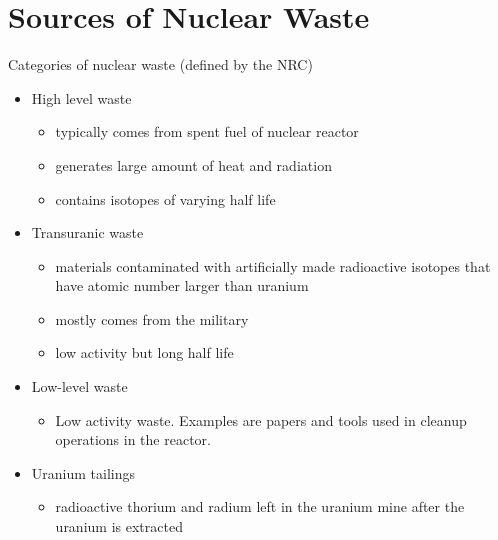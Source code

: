 \documentclass[10pt]{beamer}
\begin{document}
\section{Sources of Nuclear Waste}
\begin{frame}{Categories of nuclear waste (defined by the NRC) \cite{s01}}
\begin{itemize}[<+->]
\item \alert<13>{High level waste}
	\begin{itemize}
    \item typically comes from spent fuel of nuclear reactor
	\item generates large amount of heat and radiation
    \item contains isotopes of varying half life
    \end{itemize}
\item Transuranic waste
	\begin{itemize}
    \item materials contaminated with artificially made radioactive isotopes that have atomic number larger
    than uranium
    \item mostly comes from the military
    \item low activity but long half life
    \end{itemize}
\item Low-level waste
	\begin{itemize}
    \item Low activity waste. Examples are papers and tools used in cleanup operations in the reactor.
    \end{itemize}
\item Uranium tailings
	\begin{itemize}
	\item radioactive thorium and radium left in the uranium mine after the uranium is extracted
    \end{itemize}
\end{itemize}
\end{frame}

\end{document}
